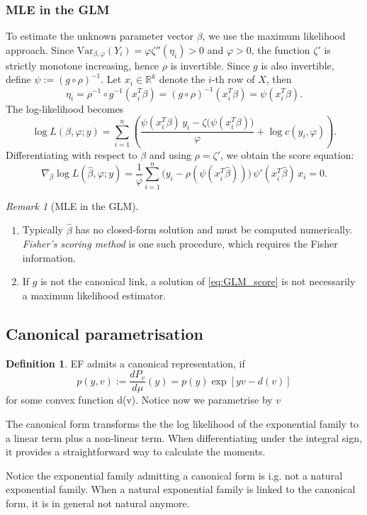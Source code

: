 \documentclass[a4paper,12pt, oneside, fleqn]{book}
\theoremstyle{definition}
\newtheorem{definition}{Definition}[section]
\theoremstyle{remark}
\newtheorem*{remark}{Remark}
\begin{document}
\subsubsection*{MLE in the GLM}

To estimate the unknown parameter vector $\beta$, we use the maximum likelihood approach. Since $\mathrm{Var}_{\beta,\varphi}(Y_i) = \varphi \zeta''(\eta_i) > 0$ and $\varphi > 0$, the function $\zeta'$ is strictly monotone increasing, hence $\rho$ is invertible. Since $g$ is also invertible, define $\psi := (g \circ \rho)^{-1}$. Let $x_i \in \mathbb{R}^k$ denote the $i$-th row of $X$, then
\begin{equation*}
	\eta_i = \rho^{-1} \circ g^{-1}(x_i^T\beta) = (g \circ \rho)^{-1}(x_i^T\beta) = \psi(x_i^T\beta).
\end{equation*}
The log-likelihood becomes
\begin{equation}
	\log L(\beta, \varphi; y) = \sum_{i=1}^n \left( \frac{\psi(x_i^T\beta)\, y_i - \zeta\big(\psi(x_i^T\beta)\big)}{\varphi} + \log c(y_i, \varphi) \right).
\end{equation}
Differentiating with respect to $\beta$ and using $\rho = \zeta'$, we obtain the score equation:
\begin{equation} \label{eq:GLM_score}
	\nabla_\beta \log L(\hat{\beta}, \varphi; y) = \frac{1}{\varphi} \sum_{i=1}^n \big(y_i - \rho(\psi(x_i^T\hat{\beta}))\big)\, \psi'(x_i^T\hat{\beta})\, x_i = 0.
\end{equation}

\begin{remark}[MLE in the GLM] ~
\begin{enumerate}
	\item Typically $\hat{\beta}$ has no closed-form solution and must be computed numerically. \emph{Fisher's scoring method} is one such procedure, which requires the Fisher information.
	\item If $g$ is not the canonical link, a solution of \eqref{eq:GLM_score} is not necessarily a maximum likelihood estimator.
\end{enumerate}
\end{remark}

\subsection{Canonical parametrisation}
\begin{definition}
	EF admits a canonical representation, if
	\begin{equation} \label{DF:EFc}
		p(y, v) := \frac{dP_v}{d\mu}(y) = p(y)\exp [yv - d(v)]
	\end{equation}
	for some convex function d(v). Notice now we parametrise by $v$
\end{definition}
The canonical form transforms the the log likelihood of the exponential family to a linear term plus a non-linear term. When differentiating under the integral sign, it provides a straightforward way to calculate the moments.\par 
Notice the exponential family admitting a canonical form is i.g. not a natural exponential family. When a natural exponential family is linked to the canonical form, it is in general not natural anymore.
\end{document}
